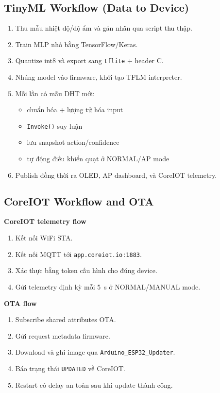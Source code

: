 \subsection{TinyML Workflow (Data to Device)}
\begin{enumerate}
    \item Thu mẫu nhiệt độ/độ ẩm và gán nhãn qua script thu thập.
    \item Train MLP nhỏ bằng TensorFlow/Keras.
    \item Quantize int8 và export sang \texttt{tflite} + header C.
    \item Nhúng model vào firmware, khởi tạo TFLM interpreter.
    \item Mỗi lần có mẫu DHT mới:
    \begin{itemize}
        \item chuẩn hóa + lượng tử hóa input
        \item \texttt{Invoke()} suy luận
        \item lưu snapshot action/confidence
        \item tự động điều khiển quạt ở NORMAL/AP mode
    \end{itemize}
    \item Publish đồng thời ra OLED, AP dashboard, và CoreIOT telemetry.
\end{enumerate}

\subsection{CoreIOT Workflow and OTA}
\textbf{CoreIOT telemetry flow}
\begin{enumerate}
    \item Kết nối WiFi STA.
    \item Kết nối MQTT tới \texttt{app.coreiot.io:1883}.
    \item Xác thực bằng token cấu hình cho đúng device.
    \item Gửi telemetry định kỳ mỗi \SI{5}{s} ở NORMAL/MANUAL mode.
\end{enumerate}

\textbf{OTA flow}
\begin{enumerate}
    \item Subscribe shared attributes OTA.
    \item Gửi request metadata firmware.
    \item Download và ghi image qua \texttt{Arduino\_ESP32\_Updater}.
    \item Báo trạng thái \texttt{UPDATED} về CoreIOT.
    \item Restart có delay an toàn sau khi update thành công.
\end{enumerate}
